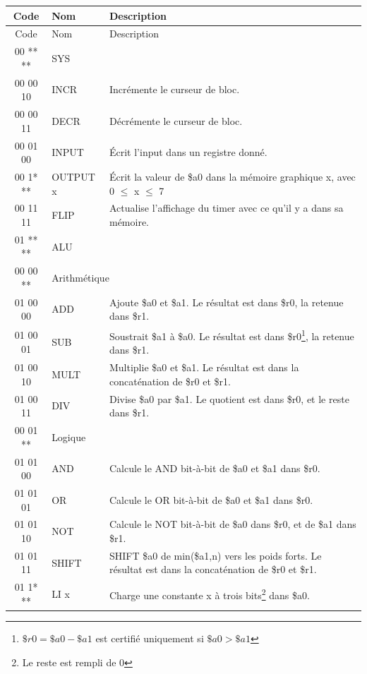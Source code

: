 \documentclass{article}
\begin{document}
\begin{savenotes}
\begin{longtable}{|c|l|l|}
  
  \hline
  Code & Nom & Description \\
  \endfirsthead
  \hline
  Code & Nom & Description \\
  \hline\hline
  \endhead

  \hline\hline
  00 ** ** & \multicolumn{2}{|l|}{SYS} \\
  \hline
  00 00 10 & INCR    & Incrémente le curseur de bloc. \\
  00 00 11 & DECR    & Décrémente le curseur de bloc. \\
  \hline\hline
  00 01 00 & INPUT    & \'Ecrit l'input dans un registre donné. \\
  00 1* ** & OUTPUT x & \'Ecrit la valeur de \$a0 dans la mémoire graphique x, avec 0 $\leq$ x $\leq$ 7 \\
  00 11 11 & FLIP     & Actualise l'affichage du timer avec ce qu'il y a dans sa mémoire. \\
  
  \hline\hline
  01 ** ** & \multicolumn{2}{|l|}{ALU} \\
  \hline
  00 00 ** & \multicolumn{2}{|l|}{Arithmétique} \\
  \hline
  01 00 00 & ADD   & Ajoute \$a0 et \$a1. Le résultat est dans \$r0, la retenue dans \$r1. \\
  01 00 01 & SUB   & Soustrait \$a1 à \$a0. Le résultat est dans \$r0\footnote{$\$r0=\$a0-\$a1$ est certifié uniquement si $\$a0>\$a1$}, la retenue dans \$r1. \\
  01 00 10 & MULT  & Multiplie \$a0 et \$a1. Le résultat est dans la concaténation de \$r0 et \$r1.\\
  01 00 11 & DIV   & Divise \$a0 par \$a1. Le quotient est dans \$r0, et le reste dans \$r1. \\
  \hline
  00 01 ** & \multicolumn{2}{|l|}{Logique} \\
  \hline
  01 01 00 & AND   & Calcule le AND bit-à-bit de \$a0 et \$a1 dans \$r0. \\
  01 01 01 & OR    & Calcule le OR bit-à-bit de \$a0 et \$a1 dans \$r0. \\
  01 01 10 & NOT   & Calcule le NOT bit-à-bit de \$a0 dans \$r0, et de \$a1 dans \$r1. \\
  01 01 11 & SHIFT & SHIFT \$a0 de min(\$a1,n) vers les poids forts. Le résultat est dans la concaténation de \$r0 et \$r1.\\
  \hline
  01 1* ** & LI x  & Charge une constante x à trois bits\footnote{Le reste est rempli de 0} dans \$a0. \\
  

\end{longtable}
\end{savenotes}
\end{document}
